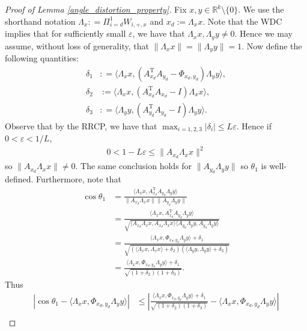 \documentclass[11pt]{article}
\renewcommand{\epsilon}{\varepsilon}
\newcommand{\R}{\mathbb{R}}
\newcommand{\PiWdix}{\Pi_{i=d}^1 W_{i,+,x}}
\renewcommand{\top}{{\mathrm{T}}}
\theoremstyle{remark}
\begin{document}
\begin{proof}[Proof of Lemma \ref{angle_distortion_property}] Fix $x,y \in \R^k \setminus \{0\}$. We use the shorthand notation $\Lambda_x: = \PiWdix$ and $x_d:=\Lambda_x x$. Note that the WDC implies that for sufficiently small $\epsilon$, we have that $\Lambda_x x, \Lambda_y y \neq 0$. Hence we may assume, without loss of generality, that $\|\Lambda_x x\| = \|\Lambda_y y\| = 1.$ Now define the following quantities: \begin{align*}
\delta_1 & : = \langle \Lambda_x x, (A_{x_d}^\top A_{y_d} - \Phi_{x_d,y_d})\Lambda_y y \rangle, \\
\delta_2 & := \langle \Lambda_x x, (A_{x_d}^\top A_{x_d} - I)\Lambda_x x \rangle, \\
\delta_3 & : = \langle \Lambda_y y ,(A_{y_d}^\top A_{y_d} - I)\Lambda_y y \rangle.
\end{align*} Observe that by the RRCP, we have that $\max_{i = 1,2,3} |\delta_i | \leqslant L\epsilon.$ Hence if $0 <\epsilon < 1/L$, \begin{align*}
0 < 1-L\epsilon \leqslant \|A_{x_d}\Lambda_x x\|^2
\end{align*} so $\|A_{x_d}\Lambda_x x\|\neq 0$. The same conclusion holds for $\|A_{y_d}\Lambda_y y\|$ so $\theta_1$ is well-defined.
Furthermore, note that \begin{align*}
\cos \theta_1 & = \frac{\langle \Lambda_x x, A_{x_d}^\top A_{y_d}\Lambda_y y \rangle}{\|A_{x_d}\Lambda_x x\|\|A_{y_d}\Lambda_y y\|} \\
& = \frac{\langle \Lambda_x x, A_{x_d}^\top A_{y_d}\Lambda_y y \rangle}{\sqrt{\langle A_{x_d}\Lambda_x x,A_{x_d}\Lambda_x x\rangle \langle A_{y_d}\Lambda_y y,A_{y_d}\Lambda_y y \rangle}} \\
& = \frac{\langle \Lambda_x x, \Phi_{x_d,
y_d}\Lambda_y y \rangle + \delta_1}{\sqrt{\left(\langle \Lambda_x x, \Lambda_x x\rangle + \delta_2\right)\left(\langle \Lambda_y y, \Lambda_y y\rangle + \delta_3\right)}} \\
& = \frac{\langle \Lambda_x x, \Phi_{x_d,y_d}\Lambda_y y \rangle + \delta_1}{\sqrt{\left(1 + \delta_2\right)\left( 1 + \delta_3\right)}}.
\end{align*} Thus \begin{align*}
\left|\cos \theta_1 - \langle \Lambda_x x, \Phi_{x_d,y_d}\Lambda_y y \rangle \right| & \leqslant \left| \frac{\langle \Lambda_x x, \Phi_{x_d,y_d}\Lambda_y y \rangle + \delta_1}{\sqrt{\left(1 + \delta_2\right)\left( 1 + \delta_3\right)}} - \langle \Lambda_x x, \Phi_{x_d,
y_d}\Lambda_y y \rangle \right| \\

\end{align*}
\end{proof}
\end{document}

